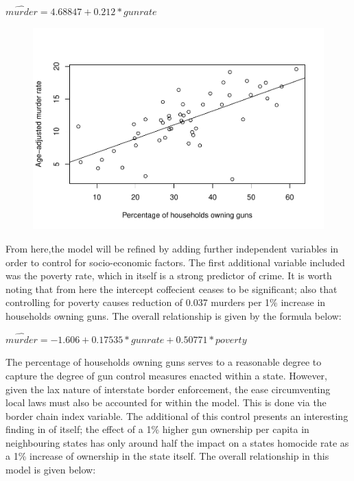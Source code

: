 \documentclass[floatsintext,mask,man]{apa6}
\theoremstyle{definition}
\theoremstyle{definition}
\theoremstyle{definition}
\theoremstyle{remark}
\begin{document}
\begin{center}
    $\widehat{murder} = 4.68847 + 0.212*\mathit{gunrate}$
    \end{center}

\begin{figure}
\centering
\includegraphics{as_files/figure-latex/unnamed-chunk-7-1.pdf}
\caption{}
\end{figure}

From here,the model will be refined by adding further independent
variables in order to control for socio-economic factors. The first
additional variable included was the poverty rate, which in itself is a
strong predictor of crime. It is worth noting that from here the
intercept coffecient ceases to be significant; also that controlling for
poverty causes reduction of 0.037 murders per 1\% increase in households
owning guns. The overall relationship is given by the formula below:

\begin{center}
$\widehat{murder} = -1.606 + 0.17535*\mathit{gunrate} + 0.50771*\mathit{poverty}$
\end{center}

The percentage of households owning guns serves to a reasonable degree
to capture the degree of gun control measures enacted within a state.
However, given the lax nature of interstate border enforcement, the ease
circumventing local laws must also be accounted for within the model.
This is done via the border chain index variable. The additional of this
control presents an interesting finding in of itself; the effect of a
1\% higher gun ownership per capita in neighbouring states has only
around half the impact on a states homocide rate as a 1\% increase of
ownership in the state itself. The overall relationship in this model is
given below:\\
\end{document}
